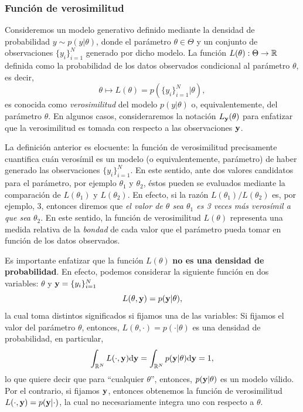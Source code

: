 \subsubsection{Función de verosimilitud} %
\label{sssub:verosimilitud} 

\begin{definition}[Verosimilitud]
Consideremos un  modelo generativo definido mediante la densidad de  probabilidad  $y\sim p(y|\theta)$, donde el  parámetro $\theta\in\Theta$ y un conjunto de observaciones $\{y_i\}_{i=1}^N$ generado por dicho modelo. La función $L(\theta): \Theta \to {\mathbb R}$ definida como la probabilidad de los datos observados condicional al parámetro $\theta$, es decir, 
\begin{equation}
			\theta   \mapsto L(\theta) =  p(\{y_i\}_{i=1}^N | \theta),
\end{equation}
es conocida como \emph{verosimilitud} del modelo $p(y|\theta)$ o, equivalentemente, del  parámetro $\theta$. En algunos casos, consideraremos la  notación $L_{\mathbf{y}}(\theta)$ para enfatizar que la verosimilitud es tomada con respecto a las observaciones  $\mathbf{y}$.
\end{definition}

La definición anterior es elocuente: la función de verosimilitud precisamente cuantifica cuán verosímil es un modelo (o equivalentemente, parámetro) de haber generado las observaciones $\{y_i\}_{i=1}^N$. En este sentido, ante dos valores candidatos para el parámetro, por ejemplo $\theta_1$ y $\theta_2$, éstos pueden se evaluados mediante la comparación de $L(\theta_1)$ y $L(\theta_2)$. En efecto, si la razón $L(\theta_1)/L(\theta_2)$ es, por ejemplo, 3, entonces diremos que \emph{el valor de $\theta$ sea $\theta_1$ es 3 veces más verosímil a que sea $\theta_2$}. En este sentido, la función de verosimilitud  $L(\theta)$ representa una medida relativa de la \emph{bondad} de cada valor que el parámetro pueda tomar en función de los datos observados.

Es importante enfatizar que la función $L(\theta)$ \textbf{no es una densidad de probabilidad}. En efecto, podemos considerar la siguiente función en dos variables: $\theta$ y $\mathbf{y}=\{y_i\}_{i=1}^N$   
\begin{equation}
	L(\theta,\mathbf{y}) = p(\mathbf{y}|\theta),
\end{equation}
la cual toma distintos significados si  fijamos una de las variables: Si fijamos el valor del parámetro $\theta$, entonces, $L(\theta,\cdot) = p(\cdot|\theta)$ es una densidad de probabilidad, en particular, 
\begin{equation}
	\int_{{\mathbb R}^N}L(\cdot,\mathbf{y}){\text d}\mathbf{y} = \int_{{\mathbb R}^N}p(\mathbf{y}|\theta){\text d}\mathbf{y} = 1,
\end{equation}
lo que quiere decir que para ``cualquier $\theta$'', entonces, $p(\mathbf{y}|\theta)$ es un modelo válido. Por el contrario, si fijamos $\mathbf{y}$, entonces obtenemos la función de verosimilitud $L(\cdot,\mathbf{y}) = p(\mathbf{y}|\cdot)$, la  cual no necesariamente integra uno con respecto a $\theta$.



